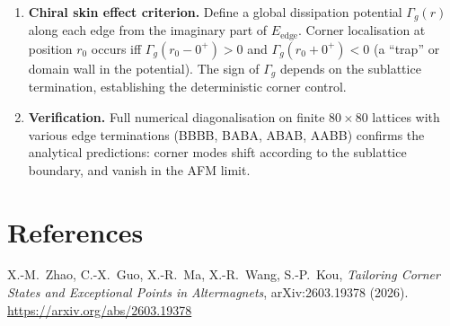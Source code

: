 \documentclass[11pt,a4paper]{article}
\begin{document}
\begin{enumerate}
  \item \textbf{Chiral skin effect criterion.}
    Define a global dissipation potential $\Gamma_g(r)$ along each edge from the imaginary part of $E_{\text{edge}}$.  Corner localisation at position $r_0$ occurs iff $\Gamma_g(r_0 - 0^+) > 0$ and $\Gamma_g(r_0 + 0^+) < 0$ (a ``trap'' or domain wall in the potential).  The sign of $\Gamma_g$ depends on the sublattice termination, establishing the deterministic corner control.

  \item \textbf{Verification.}
    Full numerical diagonalisation on finite $80\times80$ lattices with various edge terminations (BBBB, BABA, ABAB, AABB) confirms the analytical predictions: corner modes shift according to the sublattice boundary, and vanish in the AFM limit.
\end{enumerate}

\section*{References}
\noindent
X.-M.\ Zhao, C.-X.\ Guo, X.-R.\ Ma, X.-R.\ Wang, S.-P.\ Kou,
\emph{Tailoring Corner States and Exceptional Points in Altermagnets},
arXiv:2603.19378 (2026).\\
\url{https://arxiv.org/abs/2603.19378}
\end{document}
